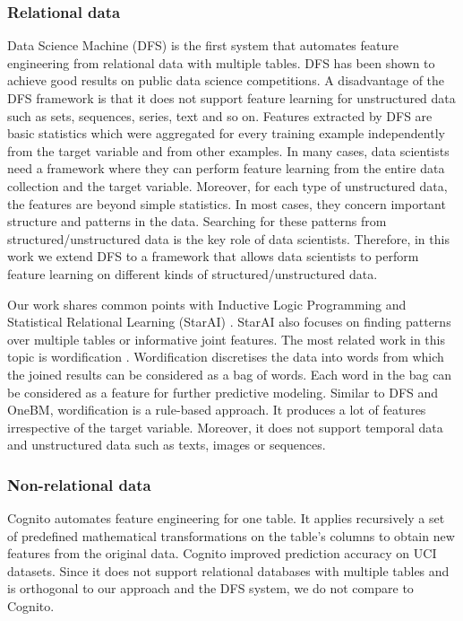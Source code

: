 \subsubsection{Relational data }
Data Science Machine (DFS) \cite{DFS} is the first system that automates feature engineering from relational data with multiple tables.  DFS has been shown to achieve good results on  public data science competitions. A disadvantage of the DFS framework is that it does not support feature learning for unstructured data such as sets, sequences, series, text and so on. Features extracted by DFS are basic statistics which were aggregated for every training example independently from the target variable and from other examples. In many cases, data scientists need a framework where they can perform feature learning from the entire data collection and the target variable. Moreover, for each type of unstructured data, the features are beyond simple statistics. In most cases, they concern important structure and patterns in the data. Searching for these patterns from structured/unstructured data is the key role of data scientists. Therefore, in this work we extend DFS to a framework that allows data scientists to perform feature learning on different kinds of structured/unstructured data. 

Our work shares common points with  Inductive Logic Programming and Statistical Relational Learning (StarAI) \cite{lisa}. StarAI also focuses on finding patterns over multiple tables or informative joint features. The most related work in this topic is wordification \cite{wordification}. Wordification discretises the data into words from which the joined results can be considered as a bag of words. Each word in the bag can be considered as a feature for further predictive modeling. Similar to DFS and OneBM, wordification is a rule-based approach. It produces a lot of features irrespective of the target variable. Moreover, it does not support temporal data and unstructured data such as texts, images or sequences.
 

\subsubsection{Non-relational data }
Cognito \cite{cognito}  automates feature engineering for one table. It applies recursively a set of predefined mathematical transformations on the table's columns to obtain new features from the original data. Cognito improved prediction accuracy on UCI datasets. Since it does not support relational databases with multiple tables and is orthogonal to our approach and the DFS system, we do not compare to Cognito. 

